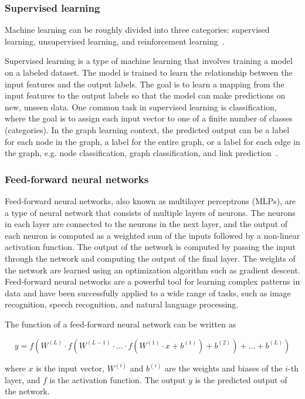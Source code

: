 \documentclass{article}
\begin{document}
\subsubsection{Supervised learning}
Machine learning can be roughly divided into three categories: supervised learning, unsupervised learning, and reinforcement learning~\cite{bishop2006pattern}.

Supervised learning is a type of machine learning that involves training a model on a labeled dataset. The model is trained to learn the relationship between the input features and the output labels. The goal is to learn a mapping from the input features to the output labels so that the model can make predictions on new, unseen data. One common task in supervised learning is classification, where the goal is to assign each input vector to one of a finite number of classes (categories). In the graph learning context, the predicted output can be a label for each node in the graph, a label for the entire graph, or a label for each edge in the graph, e.g. node classification, graph classification, and link prediction~\cite{velivckovic2023everything}.

\subsubsection{Feed-forward neural networks}

Feed-forward neural networks, also known as multilayer perceptrons (MLPs), are a type of neural network that consists of multiple layers of neurons. The neurons in each layer are connected to the neurons in the next layer, and the output of each neuron is computed as a weighted sum of the inputs followed by a non-linear activation function. The output of the network is computed by passing the input through the network and computing the output of the final layer. The weights of the network are learned using an optimization algorithm such as gradient descent. Feed-forward neural networks are a powerful tool for learning complex patterns in data and have been successfully applied to a wide range of tasks, such as image recognition, speech recognition, and natural language processing.

The function of a feed-forward neural network can be written as

$$ 
    y = f(W^{(L)} \cdot f(W^{(L-1)} \cdot \ldots \cdot f(W^{(1)} \cdot x + b^{(1)}) + b^{(2)}) + \ldots + b^{(L)})
$$

where $x$ is the input vector, $W^{(i)}$ and $b^{(i)}$ are the weights and biases of the $i$-th layer, and $f$ is the activation function. The output $y$ is the predicted output of the network.
\end{document}
